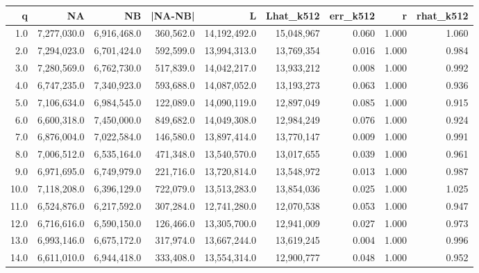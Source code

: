 \begin{tabular}{rrrrrrrrr}
\toprule
q & NA & NB & |NA-NB| & L & Lhat\_k512 & err\_k512 & r & rhat\_k512 \\
\midrule
1.0 & 7,277,030.0 & 6,916,468.0 & 360,562.0 & 14,192,492.0 & 15,048,967 & 0.060 & 1.000 & 1.060 \\
2.0 & 7,294,023.0 & 6,701,424.0 & 592,599.0 & 13,994,313.0 & 13,769,354 & 0.016 & 1.000 & 0.984 \\
3.0 & 7,280,569.0 & 6,762,730.0 & 517,839.0 & 14,042,217.0 & 13,933,212 & 0.008 & 1.000 & 0.992 \\
4.0 & 6,747,235.0 & 7,340,923.0 & 593,688.0 & 14,087,052.0 & 13,193,273 & 0.063 & 1.000 & 0.936 \\
5.0 & 7,106,634.0 & 6,984,545.0 & 122,089.0 & 14,090,119.0 & 12,897,049 & 0.085 & 1.000 & 0.915 \\
6.0 & 6,600,318.0 & 7,450,000.0 & 849,682.0 & 14,049,308.0 & 12,984,249 & 0.076 & 1.000 & 0.924 \\
7.0 & 6,876,004.0 & 7,022,584.0 & 146,580.0 & 13,897,414.0 & 13,770,147 & 0.009 & 1.000 & 0.991 \\
8.0 & 7,006,512.0 & 6,535,164.0 & 471,348.0 & 13,540,570.0 & 13,017,655 & 0.039 & 1.000 & 0.961 \\
9.0 & 6,971,695.0 & 6,749,979.0 & 221,716.0 & 13,720,814.0 & 13,548,972 & 0.013 & 1.000 & 0.987 \\
10.0 & 7,118,208.0 & 6,396,129.0 & 722,079.0 & 13,513,283.0 & 13,854,036 & 0.025 & 1.000 & 1.025 \\
11.0 & 6,524,876.0 & 6,217,592.0 & 307,284.0 & 12,741,280.0 & 12,070,538 & 0.053 & 1.000 & 0.947 \\
12.0 & 6,716,616.0 & 6,590,150.0 & 126,466.0 & 13,305,700.0 & 12,941,009 & 0.027 & 1.000 & 0.973 \\
13.0 & 6,993,146.0 & 6,675,172.0 & 317,974.0 & 13,667,244.0 & 13,619,245 & 0.004 & 1.000 & 0.996 \\
14.0 & 6,611,010.0 & 6,944,418.0 & 333,408.0 & 13,554,314.0 & 12,900,777 & 0.048 & 1.000 & 0.952 \\
\bottomrule
\end{tabular}
